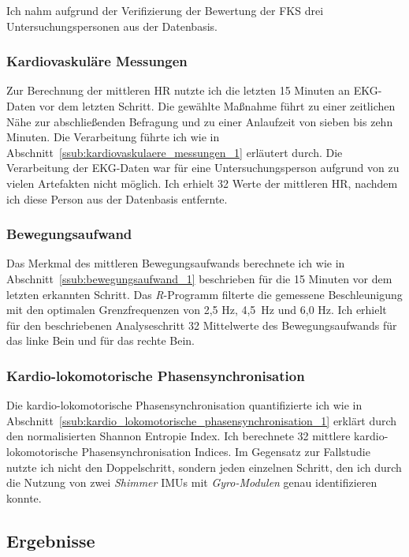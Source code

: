Ich nahm aufgrund der Verifizierung der Bewertung der \ac{FKS} drei Untersuchungspersonen aus der Datenbasis. 

\subsubsection{Kardiovaskuläre Messungen}
Zur Berechnung der mittleren \ac{HR} nutzte ich die letzten 15 Minuten an \ac{EKG}-Daten vor dem letzten Schritt. Die gewählte Maßnahme führt zu einer zeitlichen Nähe zur abschließenden Befragung und zu einer Anlaufzeit von sieben bis zehn Minuten. Die Verarbeitung führte ich wie in Abschnitt~\ref{ssub:kardiovaskulaere_messungen_1} erläutert durch. Die Verarbeitung der \ac{EKG}-Daten war für eine Untersuchungsperson aufgrund von zu vielen Artefakten nicht möglich. Ich erhielt 32 Werte der mittleren \ac{HR}, nachdem ich diese Person aus der Datenbasis entfernte.

\subsubsection{Bewegungsaufwand}
Das Merkmal des mittleren Bewegungsaufwands berechnete ich wie in Abschnitt~\ref{ssub:bewegungsaufwand_1} beschrieben für die 15 Minuten vor dem letzten erkannten Schritt. Das \emph{R}-Programm filterte die gemessene Beschleunigung mit den optimalen Grenzfrequenzen von 2,5 Hz, 4,5~Hz und 6,0 Hz. Ich erhielt für den beschriebenen Analyseschritt 32 Mittelwerte des Bewegungsaufwands für das linke Bein und für das rechte Bein.

\subsubsection{Kardio-lokomotorische Phasensynchronisation}
Die kardio-lokomotorische Phasensynchronisation quantifizierte ich wie in Abschnitt~\ref{ssub:kardio_lokomotorische_phasensynchronisation_1} erklärt durch den normalisierten Shannon Entropie Index. Ich berechnete 32 mittlere kardio-lokomotorische Phasensynchronisation Indices. Im Gegensatz zur Fallstudie nutzte ich nicht den Doppelschritt, sondern jeden einzelnen Schritt, den ich durch die Nutzung von zwei \emph{Shimmer} \acp{IMU} mit \emph{Gyro-Modulen} genau identifizieren konnte.

\subsection{Ergebnisse}

